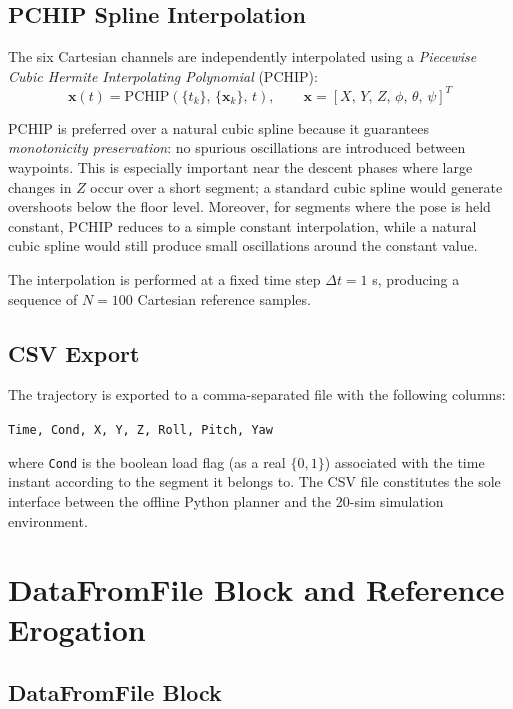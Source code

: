 \subsection{PCHIP Spline Interpolation}

The six Cartesian channels are independently interpolated using a \emph{Piecewise Cubic Hermite Interpolating Polynomial} (PCHIP):
\begin{equation}
  \mathbf{x}(t) = \mathrm{PCHIP}\!\left(\{t_k\},\,\{\mathbf{x}_k\},\,t\right), \qquad \mathbf{x} = [X,\,Y,\,Z,\,\phi,\,\theta,\,\psi]^T
\end{equation}

PCHIP is preferred over a natural cubic spline because it guarantees \emph{monotonicity preservation}: no spurious oscillations are introduced between waypoints.
This is especially important near the descent phases where large changes in $Z$ occur over a short segment; a standard cubic spline would generate overshoots below the floor level. Moreover, for segments where the pose is held constant, PCHIP reduces to a simple constant interpolation, while a natural cubic spline would still produce small oscillations around the constant value.


The interpolation is performed at a fixed time step $\Delta t = 1$ s, producing a sequence of $N = 100$ Cartesian reference samples.

\subsection{CSV Export}

The trajectory is exported to a comma-separated file with the following columns:
\begin{center}
  \texttt{Time, Cond, X, Y, Z, Roll, Pitch, Yaw}
\end{center}
where \texttt{Cond} is the boolean load flag (as a real $\{0, 1\}$) associated with the time instant according to the segment it belongs to.
The CSV file constitutes the sole interface between the offline Python planner and the 20-sim simulation environment.

\section{DataFromFile Block and Reference Erogation}

\subsection{DataFromFile Block}

